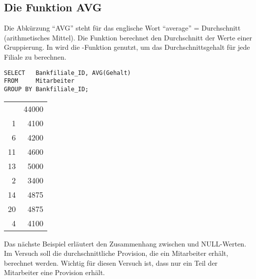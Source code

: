 \subsection{Die Funktion AVG}
Die Abkürzung \enquote{AVG} steht für das englische Wort \enquote{average} = Durchschnitt (arithmetisches Mittel). Die Funktion  berechnet den Durchschnitt der Werte einer Gruppierung.
\clearpage
In  wird die -Funktion genutzt, um das Durchschnittsgehalt für jede Filiale zu berechnen.
\begin{lstlisting}[language=oracle_sql,caption={Die AVG-Funktion},label=sql05_08]
SELECT   Bankfiliale_ID, AVG(Gehalt)
FROM     Mitarbeiter
GROUP BY Bankfiliale_ID;
        \end{lstlisting}
\begin{center}
    \begin{small}
        \tablehead{}
        \begin{msoraclesql}
            \begin{supertabular}{rr}
                & 44000 \\
                1 & 4100 \\
                6 & 4200 \\
                11 & 4600 \\
                13 & 5000 \\
                2 & 3400 \\
                14 & 4875 \\
                20 & 4875 \\
                4 & 4100 \\
            \end{supertabular}
        \end{msoraclesql}
    \end{small}
\end{center}
Das nächste Beispiel erläutert den Zusammenhang zwischen  und NULL-Werten. Im Versuch soll die durchschnittliche Provision, die ein Mitarbeiter erhält, berechnet werden. Wichtig für diesen Versuch ist, dass nur ein Teil der Mitarbeiter eine Provision erhält.
